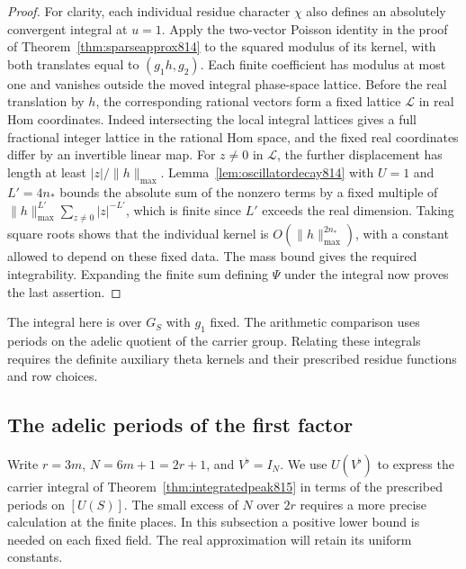 \documentclass[a4paper,11pt]{article}
\theoremstyle{definition}
\theoremstyle{remark}
\numberwithin{equation}{section}
\begin{document}
\begin{proof}
For clarity, each individual residue character \(\chi\)
also defines an absolutely convergent integral at \(u=1\).
Apply the two-vector Poisson identity in the proof of
Theorem~\ref{thm:sparseapprox814} to the squared modulus
of its kernel, with both translates equal to \((g_1h,g_2)\).
Each finite coefficient has modulus at most one and vanishes
outside the moved integral phase-space lattice. Before the
real translation by \(h\), the corresponding rational
vectors form a fixed lattice \(\mathcal L\) in real Hom
coordinates. Indeed intersecting the local integral
lattices gives a full fractional integer lattice in the
rational Hom space, and the fixed real coordinates differ
by an invertible linear map. For \(z\ne0\) in \(\mathcal L\),
the further displacement has length at least
\(|z|/\|h\|_{\max}\). Lemma~\ref{lem:oscillatordecay814}
with \(U=1\) and \(L'=4n_*\) bounds the absolute sum of
the nonzero terms by a fixed multiple of
\(\|h\|_{\max}^{L'}\sum_{z\ne0}|z|^{-L'}\), which is
finite since \(L'\) exceeds the real dimension. Taking
square roots shows that the individual kernel is
\(O(\|h\|_{\max}^{2n_*})\), with a constant allowed to
depend on these fixed data. The mass bound gives the
required integrability. Expanding the finite sum defining
\(\Psi\) under the integral now proves the last assertion.
\end{proof}

The integral here is over \(G_S\) with \(g_1\) fixed. The
arithmetic comparison uses periods on the adelic quotient
of the carrier group. Relating these integrals requires
the definite auxiliary theta kernels and their prescribed
residue functions and row choices.
\clearpage

\subsection{The adelic periods of the first factor}
\label{sec:adelicfirst816}
Write \(r=3m\), \(N=6m+1=2r+1\), and \(V^\flat=I_N\).
We use \(U(V^\flat)\) to express the carrier integral of
Theorem~\ref{thm:integratedpeak815} in terms of the prescribed
periods on \([U(S)]\). The small excess of \(N\) over
\(2r\) requires a more precise calculation at the finite
places. In this subsection a positive lower bound is needed
on each fixed field. The real approximation will retain its
uniform constants.
\end{document}
